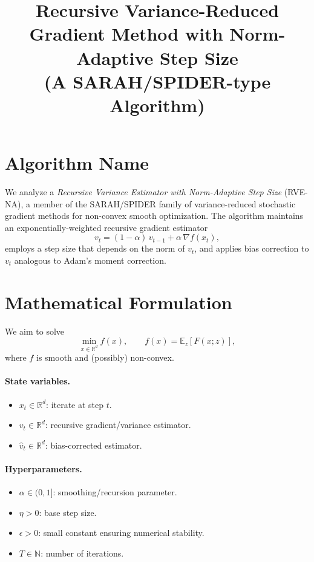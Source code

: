 \documentclass[11pt]{article}
\title{Recursive Variance-Reduced Gradient Method with Norm-Adaptive Step Size\\
\large (A SARAH/SPIDER-type Algorithm)}
\author{}
\date{}
\begin{document}
\maketitle

\section*{Algorithm Name}
We analyze a \emph{Recursive Variance Estimator with Norm-Adaptive Step Size} (RVE-NA),
a member of the SARAH/SPIDER family of variance-reduced stochastic gradient methods for
non-convex smooth optimization. The algorithm maintains an exponentially-weighted recursive
gradient estimator
\[
v_t = (1-\alpha)\, v_{t-1} + \alpha\, \nabla f(x_t),
\]
employs a step size that depends on the norm of $v_t$, and applies bias correction to
$v_t$ analogous to Adam's moment correction.

\section*{Mathematical Formulation}

We aim to solve
\[
\min_{x \in \mathbb{R}^d} f(x), \qquad f(x) = \mathbb{E}_{z}[F(x;z)],
\]
where $f$ is smooth and (possibly) non-convex.

\paragraph{State variables.}
\begin{itemize}
  \item $x_t \in \mathbb{R}^d$: iterate at step $t$.
  \item $v_t \in \mathbb{R}^d$: recursive gradient/variance estimator.
  \item $\hat v_t \in \mathbb{R}^d$: bias-corrected estimator.
\end{itemize}

\paragraph{Hyperparameters.}
\begin{itemize}
  \item $\alpha \in (0,1]$: smoothing/recursion parameter.
  \item $\eta > 0$: base step size.
  \item $\epsilon > 0$: small constant ensuring numerical stability.
  \item $T \in \mathbb{N}$: number of iterations.
\end{itemize}
\end{document}
